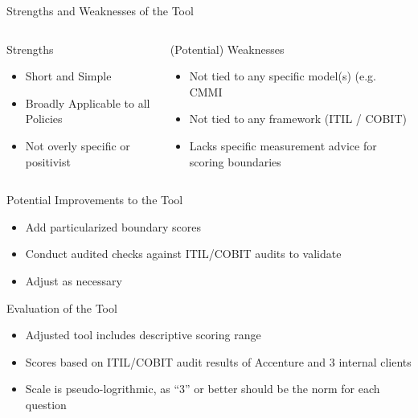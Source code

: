\documentclass[unknownkeysallowed]{beamer}
\begin{document}
\begin{frame}[label={sec:org27f2fed}]{Strengths and Weaknesses of the Tool}
\begin{columns}
\begin{column}{0.45\columnwidth}
\begin{block}{Strengths}
\begin{itemize}
\item Short and Simple
\item Broadly Applicable to all Policies
\item Not overly specific or positivist \parencite{spanacheImplicationsEUEvaluation2018}
\end{itemize}
\end{block}
\end{column}

\begin{column}{0.45\columnwidth}
\begin{block}{(Potential) Weaknesses}
\begin{itemize}
\item Not tied to any specific model(s) (e.g. CMMI \parencite{caralliMaturityModels1012012}
\item Not tied to any framework (ITIL / COBIT)
\item Lacks specific measurement advice for scoring boundaries
\end{itemize}
\end{block}
\end{column}
\end{columns}
\end{frame}


\begin{frame}[label={sec:org84e23ec}]{Potential Improvements to the Tool}
\begin{itemize}
\item<1-> Add particularized boundary scores
\item<2-> Conduct audited checks against ITIL/COBIT audits to validate
\item<3-> Adjust as necessary
\end{itemize}
\end{frame}


\begin{frame}[label={sec:orgf4762bb}]{Evaluation of the Tool}
\begin{itemize}
\item Adjusted tool includes descriptive scoring range
\item Scores based on ITIL/COBIT audit results of Accenture and 3 internal clients
\item Scale is pseudo-logrithmic, as ``3'' or better should be the norm for each question
\end{itemize}
\end{frame}
\end{document}
